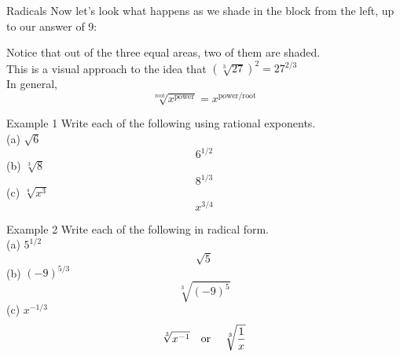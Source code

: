 \documentclass[t,usenames,dvipsnames]{beamer}
\begin{document}
\begin{frame}{Radicals}
Now let's look what happens as we shade in the block from the left, up to our answer of 9:
\begin{center}
\end{center}

Notice that out of the three equal areas, two of them are shaded. \newline\\

This is a visual approach to the idea that $\left(\sqrt[3]{27}\right)^2 = 27^{2/3}$   \newline\\

In general,
\[
\sqrt[\text{root}]{x^{\text{power}}} = x^{\text{power/root}}
\]
\end{frame}

\begin{frame}{Example 1}
Write each of the following using rational exponents.	\newline\\
(a) \quad $\sqrt{6}$		\pause	\vspace{6pt}
\[ 6^{1/2} \]	\pause	\vspace{6pt}
(b) \quad $\sqrt[3]{8}$	\pause	\vspace{6pt}
\[ 8^{1/3} \] \pause	\vspace{6pt}
(c) \quad $\sqrt[4]{x^3}$	\pause	\vspace{6pt}
\[ x^{3/4} \]
\end{frame}

\begin{frame}{Example 2}
Write each of the following in radical form.	\newline\\
(a)	\quad	$5^{1/2}$	\pause \vspace{6pt}
\[ \sqrt{5} \]	\pause \vspace{6pt}
(b)	\quad	$(-9)^{5/3}$	\pause \vspace{6pt}
\[	\sqrt[3]{(-9)^5} \] \pause \vspace{6pt}
(c)	\quad	$x^{-1/3}$	\pause \vspace{6pt}
\[ \sqrt[3]{x^{-1}} \text{\quad or \quad} \sqrt[3]{\frac{1}{x}} \]	
\end{frame}
\end{document}
